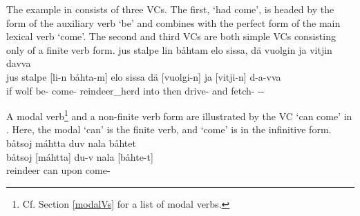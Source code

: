 The example in  consists of three VCs. The first,  ‘had come’, is headed by the  form of the auxiliary verb  ‘be’ and combines with the perfect form of the main lexical verb  ‘come’. The second and third VCs are both simple VCs consisting only of a finite verb form.
\ea\label{VCex4}
\glll	jus stalpe lin båhtam elo sissa, dä vuolgin ja vitjin davva\\
	jus stalpe [li-n {båhta-m]\subVC{}} elo sissa dä {[vuolgi-n]\subVC{}} ja {[vitji-n]\subVC{}} d-a-vva\\
	if wolf\BS{} be- come- reindeer\_herd\BS{} into then drive- and fetch- --\\\nopagebreak
{}	
\z

A modal verb\footnote{Cf. Section \ref{modalVs} for a list of modal verbs.} 
and a non-finite verb form are illustrated by the VC  ‘can come’ in . Here, the modal  ‘can’ is the finite verb, and  ‘come’ is in the infinitive form. 
\ea\label{VCex5}
\glll	båtsoj máhtta duv nala båhtet\\
	båtsoj {[máhtta]\subVC} du-v nala {[båhte-t]\subVC}\\
	reindeer\BS{} can\BS{}  upon come-\\\nopagebreak
{}	
\z

